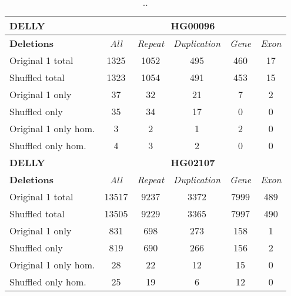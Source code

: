 \begin{table}[htb]
\caption{ .. }
\begin{center}
\begin{tabular}{|l|c||c|c|c|c|}
\hline
{\bf DELLY} & \multicolumn{5}{|c|}{\bf HG00096} \\
\hline
\cline{2-6}
{\bf Deletions} & {\it All} & {\it Repeat} & {\it Duplication} & {\it Gene} & {\it Exon} \\
\hline
Original 1 total & 1325 & 1052 & 495 & 460 & 17\\ 
\hline
Shuffled total & 1323 & 1054 & 491 & 453 & 15\\ 
\hline
Original 1 only & 37 & 32 & 21 & 7 & 2\\ 
\hline
Shuffled only & 35 & 34 & 17 & 0 & 0\\ 
\hline
Original 1 only hom. & 3 & 2 & 1 & 2 & 0\\ 
\hline
Shuffled only hom. & 4 & 3 & 2 & 0 & 0\\ 
\hline
\hline
{\bf DELLY} & \multicolumn{5}{|c|}{\bf HG02107} \\
\hline
\cline{2-6}
{\bf Deletions} & {\it All} & {\it Repeat} & {\it Duplication} & {\it Gene} & {\it Exon} \\
\hline
Original 1 total & 13517 & 9237 & 3372 & 7999 & 489\\ 
\hline
Shuffled total & 13505 & 9229 & 3365 & 7997 & 490\\ 
\hline
Original 1 only & 831 & 698 & 273 & 158 & 1\\ 
\hline
Shuffled only & 819 & 690 & 266 & 156 & 2\\ 
\hline
Original 1 only hom. & 28 & 22 & 12 & 15 & 0\\ 
\hline
Shuffled only hom. & 25 & 19 & 6 & 12 & 0\\ 
\hline
\end{tabular}
\end{center}
\label{tab:orig-vs-shuf-delly-deletions}
\end{table}

